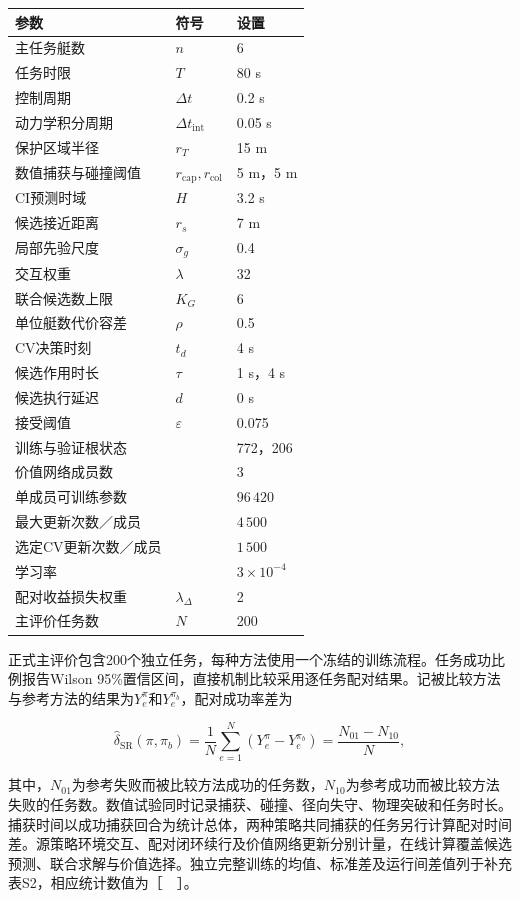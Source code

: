 \documentclass[UTF8,10.5pt,a4paper,fontset=none]{ctexart}
\begin{document}
\begingroup\small
\begin{longtable}[]{@{}lll@{}}
\toprule\noalign{}
参数 & 符号 & 设置 \\
\midrule\noalign{}
\endhead
\bottomrule\noalign{}
\endlastfoot
主任务艇数 & \(n\) & 6 \\
任务时限 & \(T\) & 80 s \\
控制周期 & \(\Delta t\) & 0.2 s \\
动力学积分周期 & \(\Delta t_{\mathrm{int}}\) & 0.05 s \\
保护区域半径 & \(r_T\) & 15 m \\
数值捕获与碰撞阈值 & \(r_{\mathrm{cap}},r_{\mathrm{col}}\) & 5 m，5 m \\
CI预测时域 & \(H\) & 3.2 s \\
候选接近距离 & \(r_s\) & 7 m \\
局部先验尺度 & \(\sigma_g\) & 0.4 \\
交互权重 & \(\lambda\) & 32 \\
联合候选数上限 & \(K_G\) & 6 \\
单位艇数代价容差 & \(\rho\) & 0.5 \\
CV决策时刻 & \(t_d\) & 4 s \\
候选作用时长 & \(\tau\) & 1 s，4 s \\
候选执行延迟 & \(d\) & 0 s \\
接受阈值 & \(\varepsilon\) & 0.075 \\
训练与验证根状态 & & 772，206 \\
价值网络成员数 & & \(3\) \\
单成员可训练参数 & & \(96\,420\) \\
最大更新次数／成员 & & \(4\,500\) \\
选定CV更新次数／成员 & & \(1\,500\) \\
学习率 & & \(3\times10^{-4}\) \\
配对收益损失权重 & \(\lambda_\Delta\) & 2 \\
主评价任务数 & \(N\) & 200 \\
\end{longtable}
\endgroup

正式主评价包含200个独立任务，每种方法使用一个冻结的训练流程。任务成功比例报告Wilson
95\%置信区间，直接机制比较采用逐任务配对结果。记被比较方法与参考方法的结果为\(Y_e^\pi\)和\(Y_e^{\pi_b}\)，配对成功率差为

\[
\widehat\delta_{\mathrm{SR}}(\pi,\pi_b)=
\frac{1}{N}\sum_{e=1}^{N}(Y_e^\pi-Y_e^{\pi_b})
=\frac{N_{01}-N_{10}}{N},
\tag{31}
\]

其中，\(N_{01}\)为参考失败而被比较方法成功的任务数，\(N_{10}\)为参考成功而被比较方法失败的任务数。数值试验同时记录捕获、碰撞、径向失守、物理突破和任务时长。捕获时间以成功捕获回合为统计总体，两种策略共同捕获的任务另行计算配对时间差。源策略环境交互、配对闭环续行及价值网络更新分别计量，在线计算覆盖候选预测、联合求解与价值选择。独立完整训练的均值、标准差及运行间差值列于补充表S2，相应统计数值为［　］。
\end{document}
